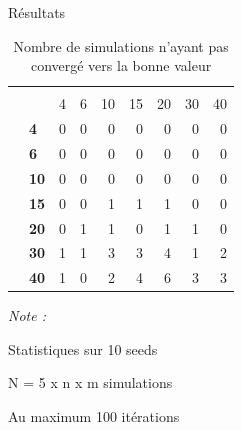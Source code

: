 \documentclass[10pt,xcolor=table,color={dvipsnames,usenames},ignorenonframetext,usepdftitle=false,french]{beamer}
\begin{document}
\begin{frame}{Résultats}
\protect\hypertarget{ruxe9sultats-3}{}

\begin{table}

\caption{\label{tab:tabq1nbnonconv}Nombre de simulations n'ayant pas convergé vers la bonne valeur}
\centering
\begin{threeparttable}
\begin{tabular}[t]{>{\bfseries}l|>{\bfseries}l|r|r|r|r|r|r|r}
\hline
\multicolumn{2}{c|}{ } & \multicolumn{7}{c}{m} \\
\cline{3-9}
  &    & 4 & 6 & 10 & 15 & 20 & 30 & 40\\
\hline
 & 4 & 0 & 0 & 0 & 0 & 0 & 0 & 0\\
\cline{2-9}
 & 6 & 0 & 0 & 0 & 0 & 0 & 0 & 0\\
\cline{2-9}
 & 10 & 0 & 0 & 0 & 0 & 0 & 0 & 0\\
\cline{2-9}
 & 15 & 0 & 0 & 1 & 1 & 1 & 0 & 0\\
\cline{2-9}
 & 20 & 0 & 1 & 1 & 0 & 1 & 1 & 0\\
\cline{2-9}
 & 30 & 1 & 1 & 3 & 3 & 4 & 1 & 2\\
\cline{2-9}
\multirow{-7}{*}{\raggedright\arraybackslash n} & 40 & 1 & 0 & 2 & 4 & 6 & 3 & 3\\
\hline
\end{tabular}
\begin{tablenotes}
\item \textit{Note : } 
\item Statistiques sur 10 seeds
\item N = 5 x n x m simulations
\item Au maximum 100 itérations
\end{tablenotes}
\end{threeparttable}
\end{table}

\end{frame}
\end{document}
